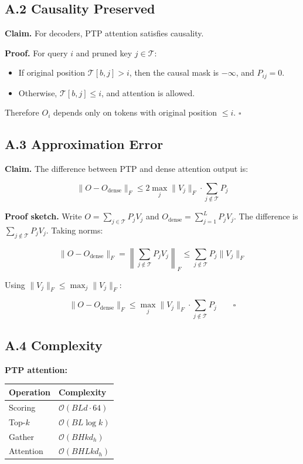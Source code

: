 {\subsection{A.2 Causality Preserved}

\textbf{Claim.} For decoders, PTP attention satisfies causality.

\textbf{Proof.} For query $i$ and pruned key $j \in \mathcal{T}$:
\begin{itemize}
\item If original position $\mathcal{T}[b, j] > i$, then the causal mask is
  $-\infty$, and $P_{ij} = 0$.
\item Otherwise, $\mathcal{T}[b, j] \leq i$, and attention is allowed.

\end{itemize}
Therefore $O_i$ depends only on tokens with original position $\leq i$. 
$\square$

\subsection{A.3 Approximation Error}

\textbf{Claim.} The difference between PTP and dense attention output is:

\[
\|O - O_\text{dense}\|_F \leq 2 \max_j \|V_j\|_F \cdot \sum_{j \notin \mathcal{T}} P_j
\tag{A.1}
\]

\textbf{Proof sketch.} Write $O = \sum_{j \in \mathcal{T}} P_j V_j$ and 
$O_\text{dense} = \sum_{j=1}^L P_j V_j$. The difference is 
$\sum_{j \notin \mathcal{T}} P_j V_j$. Taking norms:

\[
\|O - O_\text{dense}\|_F = \left\|\sum_{j \notin \mathcal{T}} P_j V_j\right\|_F \leq \sum_{j \notin \mathcal{T}} P_j \|V_j\|_F
\]

Using $\|V_j\|_F \leq \max_j \|V_j\|_F$:

\[
\|O - O_\text{dense}\|_F \leq \max_j \|V_j\|_F \cdot \sum_{j \notin \mathcal{T}} P_j \qquad \square
\]

\subsection{A.4 Complexity}

\textbf{PTP attention:}

\begin{table}[H]
\centering
\small
\begin{tabular}{ll}
\toprule
\textbf{Operation} & \textbf{Complexity} \\
\midrule
Scoring & $\mathcal{O}(B L d \cdot 64)$ \\
Top-$k$ & $\mathcal{O}(B L \log k)$ \\
Gather & $\mathcal{O}(B H k d_h)$ \\
Attention & $\mathcal{O}(B H L k d_h)$ \\
\bottomrule
\end{tabular}
\end{table}

}
